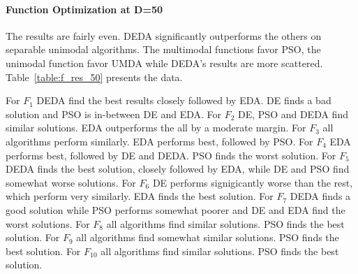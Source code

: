 \paragraph{Function Optimization at D=50}
The results are fairly even. DEDA significantly outperforms the others on separable unimodal algorithms. The multimodal functions favor PSO, the unimodal function favor UMDA while DEDA's results are more scattered. Table~\ref{table:f_res_50} presents the data.

For $F_1$ DEDA find the best results closely followed by EDA. DE finds a bad solution and PSO is in-between DE and EDA.
For $F_2$ DE, PSO and DEDA find similar solutions. EDA outperforms the all by a moderate margin.
For $F_3$ all algorithms perform similarly. EDA performs best, followed by PSO.
For $F_4$ EDA performs best, followed by DE and DEDA. PSO finds the worst solution.
For $F_5$ DEDA finds the best solution, closely followed by EDA, while DE and PSO find somewhat worse solutions.
For $F_6$ DE performs signigicantly worse than the rest, which perform very similarly. EDA finds the best solution.
For $F_7$ DEDA finds a good solution while PSO performs somewhat poorer and DE and EDA find the worst solutions.
For $F_8$ all algorithms find similar solutions. PSO finds the best solution.
For $F_9$ all algorithms find somewhat similar solutions. PSO finds the best solution.
For $F_{10}$ all algorithms find similar solutions. PSO finds the best solution.

